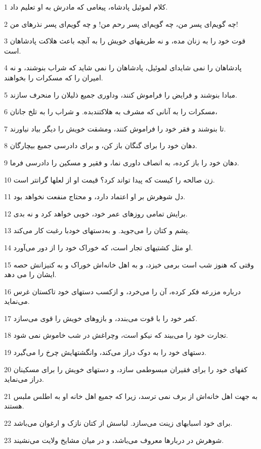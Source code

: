 \par 1 کلام لموئیل پادشاه، پیغامی که مادرش به او تعلیم داد.
\par 2 چه گویم‌ای پسر من، چه گویم‌ای پسر رحم من! و چه گویم‌ای پسر نذرهای من!
\par 3 قوت خود را به زنان مده، و نه طریقهای خویش را به آنچه باعث هلاکت پادشاهان است.
\par 4 پادشاهان را نمی شاید‌ای لموئیل، پادشاهان را نمی شاید که شراب بنوشند، و نه امیران را که مسکرات را بخواهند.
\par 5 مبادا بنوشند و فرایض را فراموش کنند، وداوری جمیع ذلیلان را منحرف سازند.
\par 6 مسکرات را به آنانی که مشرف به هلاکتندبده. و شراب را به تلخ جانان،
\par 7 تا بنوشند و فقر خود را فراموش کنند، ومشقت خویش را دیگر بیاد نیاورند.
\par 8 دهان خود را برای گنگان باز کن، و برای دادرسی جمیع بیچارگان.
\par 9 دهان خود را باز کرده، به انصاف داوری نما، و فقیر و مسکین را دادرسی فرما.
\par 10 زن صالحه را کیست که پیدا تواند کرد؟ قیمت او از لعلها گرانتر است.
\par 11 دل شوهرش بر او اعتماد دارد، و محتاج منفعت نخواهد بود.
\par 12 برایش تمامی روزهای عمر خود، خوبی خواهد کرد و نه بدی.
\par 13 پشم و کتان را می‌جوید. و به‌دستهای خودبا رغبت کار می‌کند.
\par 14 او مثل کشتیهای تجار است، که خوراک خود را از دور می‌آورد.
\par 15 وقتی که هنوز شب است برمی خیزد، و به اهل خانه‌اش خوراک و به کنیزانش حصه ایشان را می دهد.
\par 16 درباره مزرعه فکر کرده، آن را می‌خرد، و ازکسب دستهای خود تاکستان غرس می‌نماید.
\par 17 کمر خود را با قوت می‌بندد، و بازوهای خویش را قوی می‌سازد.
\par 18 تجارت خود را می‌بیند که نیکو است، وچراغش در شب خاموش نمی شود.
\par 19 دستهای خود را به دوک دراز می‌کند، وانگشتهایش چرخ را می‌گیرد.
\par 20 کفهای خود را برای فقیران مبسوطمی سازد، و دستهای خویش را برای مسکینان دراز می‌نماید.
\par 21 به جهت اهل خانه‌اش از برف نمی ترسد، زیرا که جمیع اهل خانه او به اطلس ملبس هستند.
\par 22 برای خود اسبابهای زینت می‌سازد. لباسش از کتان نازک و ارغوان می‌باشد.
\par 23 شوهرش در دربارها معروف می‌باشد، و در میان مشایخ ولایت می‌نشیند.
